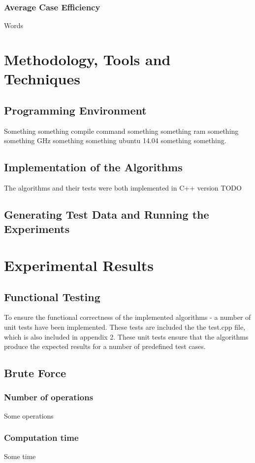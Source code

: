 \documentclass{article}
\begin{document}
        \subsubsection{Average Case Efficiency}
            Words

\section{Methodology, Tools and Techniques}
    \subsection{Programming Environment}
        Something something compile command something something ram something something GHz something something ubuntu 14.04 something something.
    \subsection{Implementation of the Algorithms}
        The algorithms and their tests were both implemented in C++ version TODO
    \subsection{Generating Test Data and Running the Experiments}

\section{Experimental Results}
    \subsection{Functional Testing}
        To ensure the functional correctness of the implemented algorithms - a number of unit tests have been implemented. These tests are included the the test.cpp file, which is also included in appendix 2. These unit tests ensure that the algorithms produce the expected results for a number of predefined test cases.
    \subsection{Brute Force}
        \subsubsection{Number of operations}
            Some operations
        \subsubsection{Computation time}
            Some time
\end{document}
